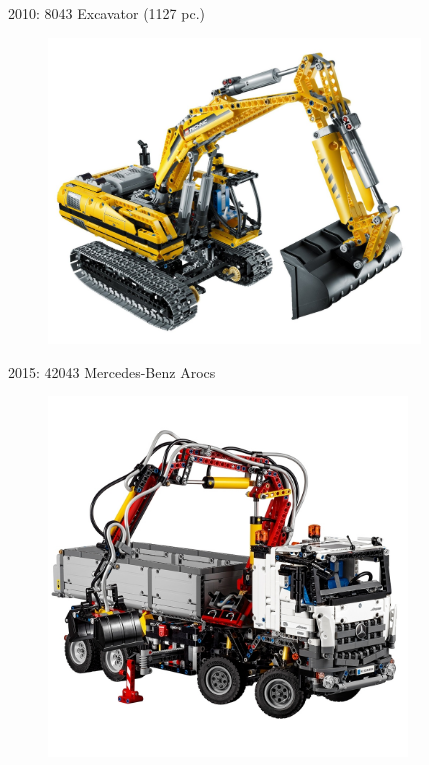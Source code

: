 \documentclass[xcolor=dvipsnames]{beamer}
\begin{document}
\begin{frame}[fragile]{2010: 8043 Excavator (1127 pc.)}
\begin{figure}[H]
 \centering
 \includegraphics[width=0.88\textwidth]{2010_8043_excavator.jpg}
\end{figure}
\end{frame}

\begin{frame}[fragile]{2015: 42043 Mercedes-Benz Arocs}
\begin{figure}[H]
 \centering
 \includegraphics[trim={0 0 0 4cm},clip,width=0.85\textwidth]{2015_mercedes_arocs_42043.jpg}
\end{figure}
\end{frame}
\end{document}
